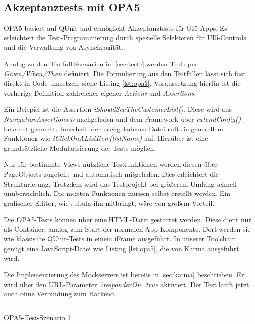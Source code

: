 \subsection{Akzeptanztests mit OPA5}
OPA5 basiert auf QUnit und ermöglicht Akzeptanztests für UI5-Apps. Es erleichtert die Test-Programmierung durch spezielle Selektoren für UI5-Controls und die Verwaltung von Asynchronität.

Analog zu den Testfall-Szenarien im \autoref{sec:tests} werden Tests per \textit{Given/When/Then} definiert. Die Formulierung aus den Testfällen lässt sich fast direkt in Code umsetzen, siehe Listing \ref{lst:opa5}. Voraussetzung hierfür ist die vorherige Definition zahlreicher eigener \textit{Actions} und \textit{Assertions}. 

Ein Beispiel ist die Assertion \textit{iShouldSeeTheCustomerList()}. Diese wird aus \textit{NavigationAssertions.js} nachgeladen und dem Framework über \textit{extendConfig()} bekannt gemacht. Innerhalb der nachgeladenen Datei ruft sie generellere Funktionen wie \textit{iClickOnAListItem(listName)} auf. Hierüber ist eine grundsätzliche Modularisierung der Tests möglich.

Nur für bestimmte Views nützliche Testfunktionen werden diesen über PageObjects zugeteilt und automatisch mitgeladen. Dies erleichtert die Strukturierung. Trotzdem wird das Testprojekt bei größerem Umfang schnell unübersichtlich. Die meisten Funktionen müssen selbst erstellt werden. Ein grafischer Editor, wie \zB Jubula ihn mitbringt, wäre von großem Vorteil.

Die OPA5-Tests können über eine HTML-Datei gestartet werden. Diese dient nur als Container, analog zum Start der normalen App-Komponente. Dort werden sie wie klassische QUnit-Tests in einem iFrame ausgeführt. In unserer Toolchain genügt eine JavaScript-Datei wie Listing \ref{lst:opa5}, die von Karma ausgeführt wird.

Die Implementierung des Mockservers ist bereits in \autoref{sec:karma} beschrieben. Er wird über den URL-Parameter \textit{?responderOn=true} aktiviert. Der Test läuft jetzt auch ohne Verbindung zum Backend.

\begin{listing}[H]
	\inputminted[tabsize=2]{js}{src/opa5.js}
	\caption{OPA5-Test-Szenario 1}
	\label{lst:opa5}
\end{listing}
